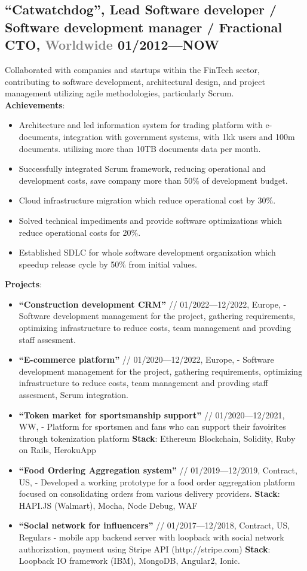 \documentclass[9pt]{extarticle}
\newcommand{\datedsubsection}[2]{%
  \subsection[#1]{\small\bfseries #1 \hfill\small #2}%
}
\begin{document}
\datedsubsection{``Catwatchdog'', \textbf{Lead Software developer / Software development manager / Fractional CTO}, \textcolor{gray}{Worldwide}}{01/2012---NOW}
Collaborated with companies and startups within the FinTech sector, contributing to software development, architectural design, and project management utilizing agile methodologies, particularly Scrum.\\
\textbf{Achievements}:
\begin{itemize}
  \item{ Architecture and led information system for trading platform with e-documents, integration with government systems, with 1kk users and 100m documents. utilizing more than 10TB documents data per month. }
  \item{ Successfully integrated Scrum framework, reducing operational and development costs, save company more than 50\% of development budget. }
  \item{ Cloud infrastructure migration which reduce operational cost by 30\%. }
  \item{ Solved technical impediments and provide software optimizations which reduce operational costs for 20\%. }
  \item{ Established SDLC for whole software development organization which speedup release cycle by 50\% from initial values.}
\end{itemize}
\textbf{Projects}:
\begin{itemize}
  \small
  \item{\textbf{``Construction development CRM''} // 01/2022---12/2022, Europe, - Software development management for the project, gathering requirements, optimizing infrastructure to reduce costs, team management and provding staff assesment.}
  \item{\textbf{``E-commerce platform''} // 01/2020---12/2022, Europe, - Software development management for the project, gathering requirements, optimizing infrastructure to reduce costs, team management and provding staff assesment, Scrum integration. }
  \item{\textbf{``Token market for sportsmanship support''} // 01/2020---12/2021, WW, - Platform for sportsmen and fans who can support their favoirites through tokenization platform}
        \textbf{Stack}: Ethereum Blockchain, Solidity, Ruby on Rails, HerokuApp
  \item{\textbf{``Food Ordering Aggregation system''} // 01/2019---12/2019, Contract, US, - Developed a working prototype for a food order aggregation platform focused on consolidating orders from various delivery providers. }
        \textbf{Stack}: HAPI.JS (Walmart), Mocha, Node Debug, WAF
  \item{\textbf{``Social network for influencers''} // 01/2017---12/2018, Contract, US, Regulars - mobile app backend server with loopback with social network authorization, payment using Stripe API (http://stripe.com)}
        \textbf{Stack}: Loopback IO framework (IBM), MongoDB, Angular2, Ionic.
\end{itemize}
\end{document}
